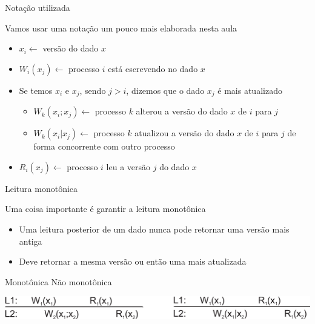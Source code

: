 \documentclass[compress]{beamer}
\begin{document}

\begin{frame}{Notação utilizada}

Vamos usar uma notação um pouco mais elaborada nesta aula
\begin{itemize}
    \item $x_i \leftarrow$ versão do dado $x$
    \item $W_i(x_j) \leftarrow$ processo $i$ está escrevendo no dado $x$
    \item Se temos $x_i$ e $x_j$, sendo $j > i$, dizemos que o dado $x_j$ é mais atualizado
    \begin{itemize}
        \item $W_k(x_i;x_j) \leftarrow$ processo $k$ alterou a versão do dado $x$ de $i$ para $j$
        \item $W_k(x_i|x_j) \leftarrow$ processo $k$ atualizou a versão do dado $x$ de $i$ para $j$ de forma concorrente com outro processo
    \end{itemize}
    \item $R_i(x_j) \leftarrow$ processo $i$ leu a versão $j$ do dado $x$
\end{itemize}
\end{frame}


\begin{frame}{Leitura monotônica}

Uma coisa importante é garantir a leitura monotônica
\begin{itemize}
    \item Uma leitura posterior de um dado nunca pode retornar uma versão mais antiga
    \item Deve retornar a mesma versão ou então uma mais atualizada
\end{itemize}

\vspace{1cm}

\centering 

Monotônica \hspace{4cm} Não monotônica

\vspace{.15cm}

\centering \includegraphics[width=\textwidth]{images/mread.png}
\end{frame}
\end{document}
